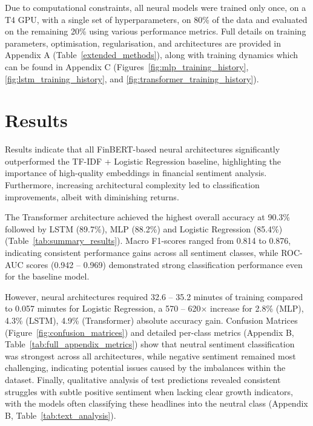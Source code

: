 \documentclass[english]{article}
\begin{document}
Due to computational constraints, all neural models were trained only once, on a T4 GPU, with a single set of hyperparameters, on 
80\% of the data and evaluated on the remaining 20\% 
using various performance metrics. Full details on training parameters, optimisation, regularisation, and architectures
are provided in Appendix A (Table~\ref{extended_methods}), along with training dynamics which can be found in 
Appendix C (Figures~\ref{fig:mlp_training_history}, \ref{fig:lstm_training_history}, and \ref{fig:transformer_training_history}).

\vspace{-1em}

\section{Results}

\vspace{-0.5em}


Results indicate that all FinBERT-based neural architectures significantly outperformed the TF-IDF + Logistic Regression baseline,
highlighting the importance of high-quality embeddings in financial sentiment analysis.
Furthermore, increasing architectural complexity led to classification improvements, albeit with diminishing returns.

The Transformer architecture achieved the highest overall accuracy at 90.3\% followed by LSTM (89.7\%),
MLP (88.2\%) and Logistic Regression (85.4\%) (Table~\ref{tab:summary_results}). Macro F1-scores
ranged from 0.814 to 0.876, indicating consistent performance gains across all 
sentiment classes, while ROC-AUC scores (0.942 -- 0.969) demonstrated strong classification 
performance even for the baseline model.

However, neural architectures required 32.6 -- 35.2 minutes of training 
compared to 0.057 minutes for Logistic Regression, a 570 -- 620× increase for 2.8\% (MLP), 4.3\% (LSTM), 4.9\% (Transformer)
absolute accuracy gain. Confusion Matrices (Figure~\ref{fig:confusion_matrices}) and detailed per-class metrics (Appendix B, Table~\ref{tab:full_appendix_metrics}) 
show that neutral sentiment classification was strongest across all architectures, while negative sentiment 
remained most challenging, indicating potential issues caused by the imbalances within the dataset. Finally, 
qualitative analysis of test predictions revealed consistent struggles
with subtle positive sentiment when lacking clear growth indicators, with the models often classifying these
headlines into the neutral class (Appendix B, Table~\ref{tab:text_analysis}).
\end{document}
